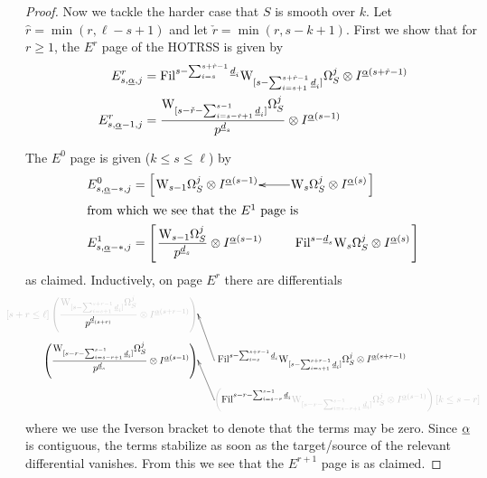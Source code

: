 \begin{proof}
  Now we tackle the harder case that $S$ is smooth over $k$. Let $\hat r=\min(r,\ell-s+1)$ and let $\check r=\min(r,s-k+1)$. First we show that for $r\ge1$, the $E^r$ page of the HOTRSS is given by
  \begin{align*}
    E^r_{s,\m\alpha,j} &= \Fil^{s-\sum_{i=s}^{s+\hat r-1}\m d_i}\dRW[[s-\sum_{i=s+1}^{s+\hat r-1}\m d_i{]}]^j_S \tnsr 
   I^{\m\alpha(s+\hat r-1)}
    \\
    E^r_{s,\m\alpha-1,j} &= \frac{\dRW[[s-\check r-\sum_{i=s-\check r+1}^{s-1} \m d_i{]}]^j_S}{p^{\m d_s}} \tnsr
    I^{\m\alpha(s-1)}
  \end{align*}

  The $E^0$ page is given ($k\le s\le \ell$) by
  \begin{align*}
    E^0_{s,\m\alpha-*,j} &=
    \left[\xymatrix@1{
        \ds\dRW[s-1]^j_S \tnsr
        I^{\m\alpha(s-1)}
        &
        \ar[l]
        \ds\dRW[s]^j_S \tnsr
        I^{\m\alpha(s)}
      }\right]
      \\
      \intertext{from which we see that the $E^1$ page is}
      E^1_{s,\m\alpha-*,j} &=
        \left[\xymatrix@1{
                \ds\frac{\dRW[s-1]^j_S}{p^{\m d_s}} \tnsr
                I^{\m\alpha(s-1)}
                &
                \ds\Fil^{s-\m d_s}\dRW[s]^j_S \tnsr
                I^{\m\alpha(s)}
  }\right]
  \end{align*}
  as claimed. Inductively, on page $E^r$ there are differentials
  \small\[\hspace{-2em}\xymatrix@C=-22em@R=1em{
      *!R{\fade{[s+r\le\ell]\left(\ds\frac{\dRW[[s-\sum_{i=s+1}^{s+r-1}\m d_i{]}]^j_S}{\fade[100]{p^{\m d_{(s+r)}}}} \tnsr
            I^{\m\alpha(s+r-1)}
\right)}}\\
      *!R{\left(\ds\frac{\dRW[[s-r-\sum_{i=s-r+1}^{s-1}\m d_i{]}]^j_S}{p^{\m d_s}} \tnsr
          I^{\m\alpha(s-1)} %
  \right)}
     & *!L{\ \ds\Fil^{s - \sum_{i=s}^{s+r-1}\m d_i} \dRW[[s-\sum_{i=s+1}^{s+r-1}\m d_i{]}]^j_S \tnsr
       I^{\m\alpha(s+r-1)} %
   } \ar[ul]\\
     & *!L{\fade{\left(\ds\fade[100]{\Fil^{s-r-\sum_{i=s-r}^{s-1}\m d_i}} \dRW[[s-r-\sum_{i=s-r+1}^{s-1}\m d_i{]}]^j_S \tnsr
           I^{\m\alpha(s-1)} %
     \right)[k\le s-r]}}
     \ar[ul]
}\]\normalsize
where we use the Iverson bracket to denote that the terms may be zero. Since $\m\alpha$ is contiguous, the terms stabilize as soon as the target/source of the relevant differential vanishes. From this we see that the $E^{r+1}$ page is as claimed.


\end{proof}
